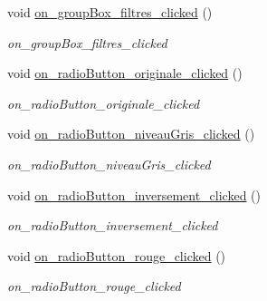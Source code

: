 \begin{DoxyCompactItemize}
\mbox{\label{classAppMainWindow_a664a99b0efe59a0281ecca95305b85a1}} 
void \hyperlink{classAppMainWindow_a664a99b0efe59a0281ecca95305b85a1}{on\+\_\+group\+Box\+\_\+filtres\+\_\+clicked} ()
\begin{DoxyCompactList}\small\item\em on\+\_\+group\+Box\+\_\+filtres\+\_\+clicked \end{DoxyCompactList}\item 
\mbox{\label{classAppMainWindow_af2bc6c9054b58823f3a0fa79e4f2ccde}} 
void \hyperlink{classAppMainWindow_af2bc6c9054b58823f3a0fa79e4f2ccde}{on\+\_\+radio\+Button\+\_\+originale\+\_\+clicked} ()
\begin{DoxyCompactList}\small\item\em on\+\_\+radio\+Button\+\_\+originale\+\_\+clicked \end{DoxyCompactList}\item 
\mbox{\label{classAppMainWindow_a49bda23245ce5b1935669a6a50a22d65}} 
void \hyperlink{classAppMainWindow_a49bda23245ce5b1935669a6a50a22d65}{on\+\_\+radio\+Button\+\_\+niveau\+Gris\+\_\+clicked} ()
\begin{DoxyCompactList}\small\item\em on\+\_\+radio\+Button\+\_\+niveau\+Gris\+\_\+clicked \end{DoxyCompactList}\item 
\mbox{\label{classAppMainWindow_a529f3a819034ca1497ff3d20994dba3c}} 
void \hyperlink{classAppMainWindow_a529f3a819034ca1497ff3d20994dba3c}{on\+\_\+radio\+Button\+\_\+inversement\+\_\+clicked} ()
\begin{DoxyCompactList}\small\item\em on\+\_\+radio\+Button\+\_\+inversement\+\_\+clicked \end{DoxyCompactList}\item 
\mbox{\label{classAppMainWindow_a9e7a5a2b083e8d3c309bbd1beaf14937}} 
void \hyperlink{classAppMainWindow_a9e7a5a2b083e8d3c309bbd1beaf14937}{on\+\_\+radio\+Button\+\_\+rouge\+\_\+clicked} ()
\begin{DoxyCompactList}\small\item\em on\+\_\+radio\+Button\+\_\+rouge\+\_\+clicked \end{DoxyCompactList}\item 

\end{DoxyCompactItemize}
